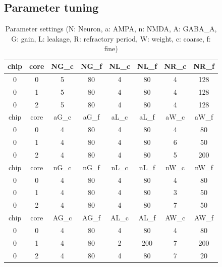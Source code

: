 \subsection{Parameter tuning}
\begin{table}
	\centering
	\begin{tabular}{cccccccc}
		\midrule
		chip  & core  & NG\_c & NG\_f & NL\_c & NL\_f & NR\_c & NR\_f \\
		\midrule
		0     & 0     & 5     & 80    & 4     & 80    & 4     & 128 \\
		0     & 1     & 5     & 80    & 4     & 80    & 4     & 128 \\
		0     & 2     & 5     & 80    & 4     & 80    & 4     & 128 \\
		\midrule
		chip  & core  & aG\_c & aG\_f & aL\_c & aL\_f & aW\_c & aW\_f \\
		\midrule
		0     & 0     & 4     & 80    & 4     & 80    & 4     & 80 \\
		0     & 1     & 4     & 80    & 4     & 80    & 6     & 50 \\
		0     & 2     & 4     & 80    & 4     & 80    & 5     & 200 \\
		\midrule
		chip  & core  & nG\_c & nG\_f & nL\_c & nL\_f & nW\_c & nW\_f \\
		\midrule
		0     & 0     & 4     & 80    & 4     & 80    & 4     & 80 \\
		0     & 1     & 4     & 80    & 4     & 80    & 3     & 50 \\
		0     & 2     & 4     & 80    & 4     & 80    & 7     & 50 \\
		\midrule
		chip  & core  & AG\_c & AG\_f & AL\_c & AL\_f & AW\_c & AW\_f \\
		\midrule
		0     & 0     & 4     & 80    & 4     & 80    & 4     & 80 \\
		0     & 1     & 4     & 80    & 2     & 200   & 7     & 200 \\
		0     & 2     & 4     & 80    & 4     & 80    & 7     & 20 \\
		\bottomrule
	\end{tabular}%
	\label{tab:parameter}%
	\caption{Parameter settings (N: Neuron, a: AMPA, n: NMDA, A: GABA\_A, G:  gain, L: leakage, R: refractory period, W: weight, c: coarse, f: fine)}
\end{table}%
